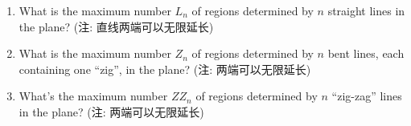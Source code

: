 \documentclass[a4paper, justified]{tufte-handout}
\begin{document}
\begin{solution}
\end{solution}

\begin{problem}
  \begin{enumerate}[(1)]
    \item What is the maximum number $L_n$ of regions 
      determined by $n$ straight lines in the plane?
      (注: 直线两端可以无限延长)
    \item What is the maximum number $Z_n$ of regions 
      determined by $n$ bent lines, each containing one ``zig'', 
      in the plane?
      (注: 两端可以无限延长)
    \item What's the maximum number $ZZ_n$ of regions
      determined by $n$ ``zig-zag'' lines in the plane?
      (注: 两端可以无限延长)
  \end{enumerate}
\end{problem}

\begin{solution}
\end{solution}

\begin{problem}
\end{problem}

\begin{solution}
\end{solution}

\begin{problem}
\end{problem}

\begin{solution}
\end{solution}

\begin{problem}
\end{problem}

\begin{solution}
\end{solution}
\end{document}
